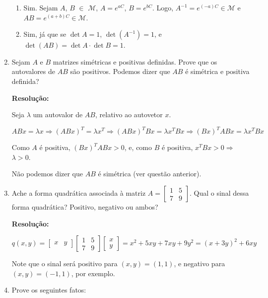 \documentclass[leqno]{article}
\begin{document}
\begin{enumerate}
\begin{enumerate}
        \item Sim. Sejam $A$, $B$ $\in$ $\mathcal{M}$, $A=e^{aC}$, $B=e^{bC}$. Logo, $A^{-1}=e^{(-a)C}\in\mathcal{M}$ e $AB=e^{(a+b)C}\in\mathcal{M}$.
        
        \item Sim, já que se $\det A=1$, $\det (A^{-1})=1$, e $\det(AB)=\det A\cdot\det B=1$.
    \end{enumerate}
    
    \item Sejam $A$ e $B$ matrizes simétricas e positivas definidas. Prove que os autovalores de $AB$ são positivos. Podemos dizer que $AB$ é simétrica e positiva definida?
    
    \textbf{Resolução:}
    
    Seja $\lambda$ um autovalor de $AB$, relativo ao autovetor $x$.
    
    $$ABx=\lambda x\Rightarrow(ABx)^T=\lambda x^T\Rightarrow(ABx)^TBx=\lambda x^TBx\Rightarrow (Bx)^TABx=\lambda x^TBx$$
    
    Como $A$ é positiva, $(Bx)^TABx>0$, e, como $B$ é positiva, $x^TBx>0\Rightarrow$ $\lambda>0$.
    
    Não podemos dizer que $AB$ é simétrica (ver questão anterior).
    
    \item Ache a forma quadrática associada à matriz $A=\begin{bmatrix}1 & 5\\
    7 & 9\end{bmatrix}$. Qual o sinal dessa forma quadrática? Positivo, negativo ou ambos?
    
    \textbf{Resolução:}
    
    $$q(x,y)=\begin{bmatrix}x & y\end{bmatrix}\begin{bmatrix}1 & 5\\
    7 & 9\end{bmatrix}\begin{bmatrix}x\\
    y\end{bmatrix}=x^2+5xy+7xy+9y^2=(x+3y)^2+6xy$$
    
    Note que o sinal será positivo para $(x,y)=(1,1)$, e negativo para $(x,y)=(-1,1)$, por exemplo.

    \item Prove os seguintes fatos:
    

\end{enumerate}
\end{document}
